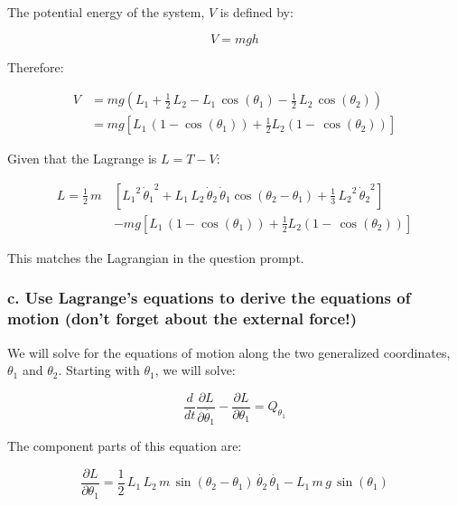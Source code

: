 \documentclass[12pt, letterpaper]{../assignment}
\begin{document}
The potential energy of the system, $V$ is defined by:

$$ V = mgh $$

Therefore:

\begin{equation*}
    \begin{aligned}
    V &= m g \left(L_{1}+\frac{1}{2}\,L_{2}-L_{1}\,\cos\left(\theta _{1}\right)-\frac{1}{2}\,L_{2}\,\cos\left(\theta _{2}\right)\right) \\
    &= m g \left[L_{1}\,\left(1-\cos\left(\theta _{1}\right)\right)+\frac{1}{2} L_{2}\left(1-\,\cos\left(\theta _{2}\right)\right)\right]
    \end{aligned}
\end{equation*}


Given that the Lagrange is $ L = T - V $:

\begin{answer}
\begin{equation*}
\begin{aligned}
            L = \frac{1}{2}\,m\,&\left[{L_{1}}^2\,{\dot{\theta} _{1}}^2
+L_{1}\,L_{2}\,\dot{\theta} _{2}\,\dot{\theta} _{1}\cos\left(\theta _{2}-\theta _{1}\right)
+\frac{1}{3}\,{L_{2}}^2\,{\dot{\theta} _{2}}^2\right]\\
&- m g \left[L_{1}\,\left(1-\cos\left(\theta _{1}\right)\right)+\frac{1}{2} L_{2}\left(1-\,\cos\left(\theta _{2}\right)\right)\right]
\end{aligned}
\end{equation*}
\end{answer}

This matches the Lagrangian in the question prompt.

\subsubsection*{c. Use Lagrange's equations to derive the equations of motion (don't forget about the external
force!)}

We will solve for the equations of motion along the two generalized coordinates, $\theta_1$ and $\theta_2$.
Starting with $\theta_1$, we will solve:

$$ \frac{d}{d t} \frac{\partial L}{\partial \dot{\theta_1}} - \frac{\partial L}{\partial \theta_1} = Q_{\theta_1} $$

The component parts of this equation are:

$$ \frac{\partial L}{\partial \theta_1} = 
\frac{1}{2}\,L_1 \,L_2 \,m\,\sin \left(\theta_2 -\theta_1 \right)\,\dot{\theta_2} \,\dot{\theta_1} -L_1 \,m\,g\,\sin \left(\theta_1 \right) $$
\end{document}
